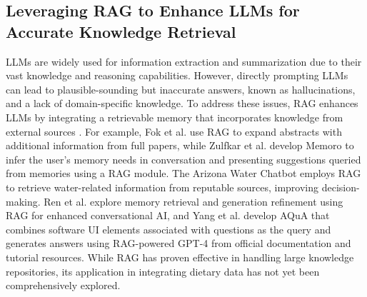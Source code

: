 \subsection{Leveraging RAG to Enhance LLMs for Accurate Knowledge Retrieval}
LLMs are widely used for information extraction and summarization due to their vast knowledge and reasoning capabilities. However, directly prompting LLMs can lead to plausible-sounding but inaccurate answers, known as hallucinations, and a lack of domain-specific knowledge. To address these issues, RAG enhances LLMs by integrating a retrievable memory that incorporates knowledge from external sources \cite{llmhallucination,ragsurvey}. 
For example, Fok et al. \cite{Qlarify} use RAG to expand abstracts with additional information from full papers, while Zulfkar et al. \cite{Memoro} develop Memoro to infer the user's memory needs in conversation and presenting suggestions queried from memories using a RAG module. 
The Arizona Water Chatbot \cite{Arizona_Water_Chatbot} employs RAG to retrieve water-related information from reputable sources, improving decision-making.
Ren et al. \cite{Memolet} explore memory retrieval and generation refinement using RAG for enhanced conversational AI, and Yang et al. \cite{yang2024aqua} develop AQuA that combines software UI elements associated with questions as the query and generates answers using RAG-powered GPT-4 from official documentation and tutorial resources.
While RAG has proven effective in handling large knowledge repositories, its application in integrating dietary data has not yet been comprehensively explored.